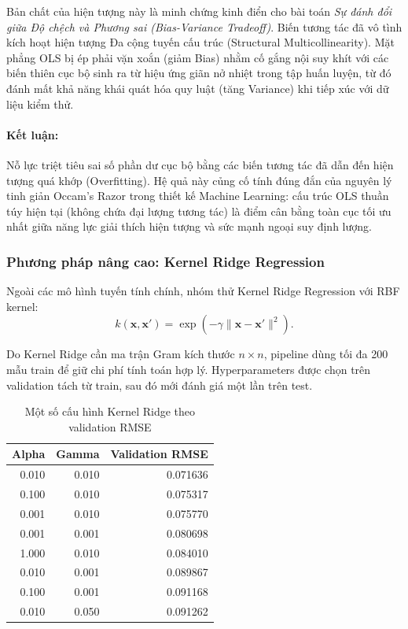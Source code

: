 Bản chất của hiện tượng này là minh chứng kinh điển cho bài toán \emph{Sự đánh đổi giữa Độ chệch và 
Phương sai (Bias-Variance Tradeoff)}. Biến tương tác đã vô tình kích hoạt hiện tượng Đa cộng tuyến 
cấu trúc (Structural Multicollinearity). Mặt phẳng OLS bị ép phải vặn xoắn (giảm Bias) nhằm cố gắng 
nội suy khít với các biến thiên cục bộ sinh ra từ hiệu ứng giãn nở nhiệt trong tập huấn luyện, từ đó 
đánh mất khả năng khái quát hóa quy luật (tăng Variance) khi tiếp xúc với dữ liệu kiểm thử.

\paragraph{Kết luận:}
Nỗ lực triệt tiêu sai số phần dư cục bộ bằng các biến tương tác đã dẫn đến hiện tượng quá khớp (Overfitting). 
Hệ quả này củng cố tính đúng đắn của nguyên lý tinh giản Occam's Razor trong thiết kế Machine Learning: 
cấu trúc OLS thuần túy hiện tại (không chứa đại lượng tương tác) là điểm cân bằng toàn cục tối ưu nhất 
giữa năng lực giải thích hiện tượng và sức mạnh ngoại suy định lượng.

\subsubsection{Phương pháp nâng cao: Kernel Ridge Regression}

Ngoài các mô hình tuyến tính chính, nhóm thử Kernel Ridge Regression với RBF kernel:
\begin{equation}
    k(\mathbf{x},\mathbf{x}')
    = \exp\left(-\gamma\|\mathbf{x}-\mathbf{x}'\|^2\right).
\end{equation}

Do Kernel Ridge cần ma trận Gram kích thước $n\times n$, pipeline dùng tối đa 200 mẫu train để giữ
chi phí tính toán hợp lý. Hyperparameters được chọn trên validation tách từ train, sau đó mới đánh
giá một lần trên test.

\begin{table}[H]
\centering
\caption{Một số cấu hình Kernel Ridge theo validation RMSE}
\label{tab:part2_kernel_search}
\begin{tabular}{@{}rrr@{}}
\hline
\textbf{Alpha} & \textbf{Gamma} & \textbf{Validation RMSE} \\
\hline
0.010 & 0.010 & 0.071636 \\
0.100 & 0.010 & 0.075317 \\
0.001 & 0.010 & 0.075770 \\
0.001 & 0.001 & 0.080698 \\
1.000 & 0.010 & 0.084010 \\
0.010 & 0.001 & 0.089867 \\
0.100 & 0.001 & 0.091168 \\
0.010 & 0.050 & 0.091262 \\
\hline
\end{tabular}
\end{table}

